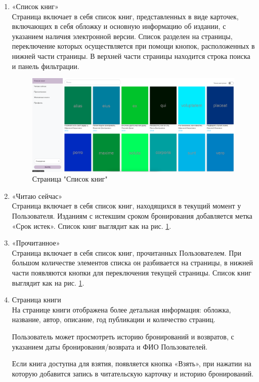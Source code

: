 \documentclass[project.tex]{subfiles}
\begin{document}
\begin{enumerate}
    \item «Список книг»\\
    Страница включает в себя список книг, представленных в виде карточек, включающих в себя обложку и основную информацию об издании, с указанием наличия электронной версии.
    Список разделен на страницы, переключение которых осуществляется при помощи кнопок, расположенных в нижней части страницы.
    В верхней части страницы находится строка поиска и панель фильтрации.
    \begin{figure}[H]
        \includegraphics[width=\textwidth]{../../graphics/mainpage.png}
        \caption{Страница "Список книг"}
        \label{pic:main}
    \end{figure}
    \item «Читаю сейчас»\\
    Страница включает в себя список книг, находящихся в текущий момент у Пользователя. Изданиям с истекшим сроком бронирования добавляется метка «Срок истек». Список книг выглядит как на рис. \ref{pic:main}.
    \item «Прочитанное»\\
    Страница включает в себя список книг, прочитанных Пользователем. При большом количестве элементов списка он разбивается на страницы, в нижней части появляются кнопки для переключения текущей страницы. Список книг выглядит как на рис. \ref{pic:main}.
    \item Страница книги\\
    На странице книги отображена более детальная информация: обложка, название, автор, описание, год публикации и количество страниц.
    \par
    Пользователь может просмотреть историю бронирований и возвратов, с указанием даты бронирования/возврата и ФИО Пользователей.
    \par
    Если книга доступна для взятия, появляется кнопка «Взять», при нажатии на которую добавится запись в читательскую карточку и историю бронирований.

\end{enumerate}
\end{document}
